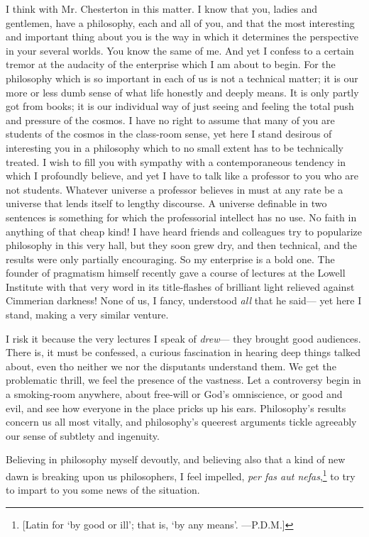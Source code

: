 \documentclass[]{article}
\begin{document}
I think with Mr. Chesterton in this matter. I know that you, ladies and
gentlemen, have a philosophy, each and all of you, and that the most
interesting and important thing about you is the way in which it
determines the perspective in your several worlds. You know the same
of me. And yet I confess to a certain tremor at the audacity of the
enterprise which I am about to begin. For the philosophy which is so
important in each of us is not a technical matter; it is our more or
less dumb sense of what life honestly and deeply means. It is only
partly got from books; it is our individual way of just seeing and
feeling the total push and pressure of the cosmos. I have no right to
assume that many of you are students of the cosmos in the class-room
sense, yet here I stand desirous of interesting you in a philosophy
which to no small extent has to be technically treated. I wish to fill
you with sympathy with a contemporaneous tendency in which I profoundly
believe, and yet I have to talk like a professor to you who are not
students. Whatever universe a professor believes in must at any rate be
a universe that lends itself to lengthy discourse. A universe definable
in two sentences is something for which the professorial intellect has
no use. No faith in anything of that cheap kind! I have heard friends
and colleagues try to popularize philosophy in this very hall, but they
soon grew dry, and then technical, and the results were only partially
encouraging. So my enterprise is a bold one. The founder of pragmatism
himself recently gave a course of lectures at the Lowell Institute with
that very word in its title-flashes of brilliant light relieved
against Cimmerian darkness! None of us, I fancy, understood \emph{all} that he
said--- yet here I stand, making a very similar venture.

I risk it because the very lectures I speak of \emph{drew}--- they brought good
audiences. There is, it must be confessed, a curious fascination in
hearing deep things talked about, even tho neither we nor the disputants
understand them. We get the problematic thrill, we feel the presence of
the vastness. Let a controversy begin in a smoking-room anywhere, about
free-will or God's omniscience, or good and evil, and see how everyone
in the place pricks up his ears. Philosophy's results concern us all
most vitally, and philosophy's queerest arguments tickle agreeably our
sense of subtlety and ingenuity.

Believing in philosophy myself devoutly, and believing also that a kind
of new dawn is breaking upon us philosophers, I feel impelled, \emph{per fas
aut nefas},\footnote{[Latin for `by good or ill'; that is, `by any means'. ---P.D.M.]} to try to impart to you some news of the situation.
\end{document}
